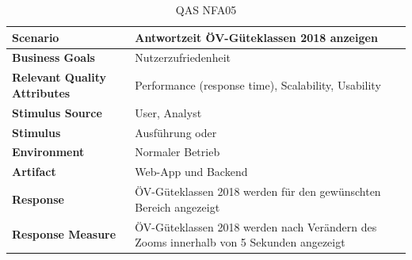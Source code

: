 \begin{table}[H]
    \begin{tabular}{l p{10.6cm}}
        \toprule
        \textbf{Scenario}
                                & Antwortzeit ÖV-Güteklassen 2018 anzeigen\\
        \midrule
        \textbf{Business Goals}
                                & Nutzerzufriedenheit\\
        \textbf{Relevant Quality Attributes}
                                & Performance (response time), Scalability, Usability\\
        \textbf{Stimulus Source}
                                & User, Analyst\\
        \textbf{Stimulus}
                                & Ausführung \nameref{Use Cases:UC06} oder \nameref{Use Cases:UC07}\\
        \textbf{Environment}
                                & Normaler Betrieb\\
        \textbf{Artifact}
                                & Web-App und Backend\\
        \textbf{Response}
                                & ÖV-Güteklassen 2018 werden für den gewünschten Bereich angezeigt\\  
        \textbf{Response Measure}
                                & ÖV-Güteklassen 2018 werden nach Verändern des Zooms innerhalb von 5 Sekunden angezeigt\\
        \bottomrule
    \end{tabular}
    \caption{QAS NFA05}
    \label{table:nfa05}
\end{table}
